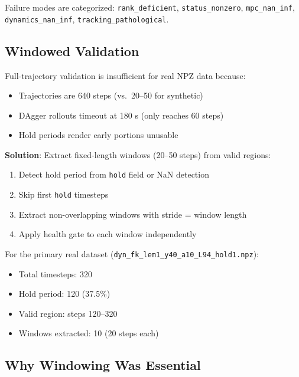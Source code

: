 \documentclass[conference]{IEEEtran}
\begin{document}
Failure modes are categorized: \texttt{rank\_deficient}, \texttt{status\_nonzero}, \texttt{mpc\_nan\_inf}, \texttt{dynamics\_nan\_inf}, \texttt{tracking\_pathological}.

\subsection{Windowed Validation}

Full-trajectory validation is insufficient for real NPZ data because:
\begin{itemize}
\item Trajectories are 640 steps (vs.~20--50 for synthetic)
\item DAgger rollouts timeout at 180 s (only reaches 60 steps)
\item Hold periods render early portions unusable
\end{itemize}

\textbf{Solution}: Extract fixed-length windows (20--50 steps) from valid regions:
\begin{enumerate}
\item Detect hold period from \texttt{hold} field or NaN detection
\item Skip first \texttt{hold} timesteps
\item Extract non-overlapping windows with stride = window length
\item Apply health gate to each window independently
\end{enumerate}

For the primary real dataset (\texttt{dyn\_fk\_lem1\_y40\_a10\_L94\_hold1.npz}):
\begin{itemize}
\item Total timesteps: 320
\item Hold period: 120 (37.5\%)
\item Valid region: steps 120--320
\item Windows extracted: 10 (20 steps each)
\end{itemize}

\subsection{Why Windowing Was Essential}
\end{document}
